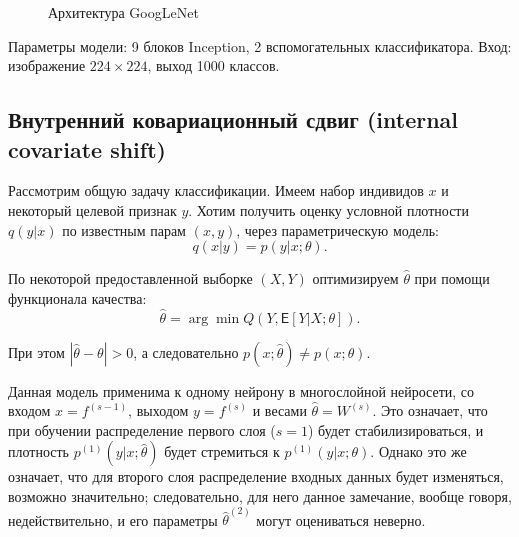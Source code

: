 \documentclass[12pt, specialist, subf, substylefile = spbu.rtx]{disser}
\newcommand{\Expect}{\mathsf{E}}
\begin{document}
\begin{figure}[h]
\caption{Архитектура GoogLeNet}
\label{img:googlenet}
\end{figure}

Параметры модели: 9 блоков Inception, 2 вспомогательных классификатора. Вход: изображение $224 \times 224$, выход 1000 классов.

\subsection{Внутренний ковариационный сдвиг (internal covariate shift)}


Рассмотрим общую задачу классификации. Имеем набор индивидов $x$ и некоторый целевой признак $y$. Хотим получить оценку условной плотности $q(y|x)$ по известным парам $(x, y)$, через параметрическую модель: 
$$
q(x|y)=p(y|x; \theta).
$$

По некоторой предоставленной выборке $(X, Y)$ оптимизируем $\hat{\theta}$ при помощи функционала качества:
$$
\hat{\theta}=\arg \min Q(Y, \Expect[Y|X; \theta]).
$$

При этом $|\hat{\theta} - \theta| > 0$, а следовательно $p(x; \hat{\theta}) \ne p(x; \theta)$. 

Данная модель применима к одному нейрону в многослойной нейросети, со входом $x=f^{(s-1)}$, выходом $y=f^{(s)}$ и весами $\hat{\theta}=W^{(s)}$. Это означает, что при обучении распределение первого слоя ($s=1$) будет стабилизироваться, и плотность $p^{(1)}(y|x; \hat{\theta})$ будет стремиться к $p^{(1)}(y|x; \theta)$. Однако это же означает, что для второго слоя распределение входных данных будет изменяться, возможно значительно; следовательно, для него данное замечание, вообще говоря, недействительно, и его параметры $\hat{\theta}^{(2)}$ могут оцениваться неверно. 
\end{document}
